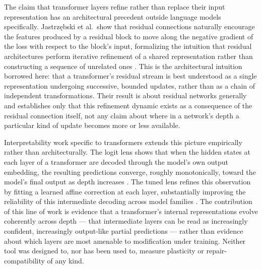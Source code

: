 \documentclass[11pt]{article}
\begin{document}
The claim that transformer layers refine rather than replace their input representation has an architectural precedent outside language models specifically. Jastrz\k{e}bski et al.\ show that residual connections naturally encourage the features produced by a residual block to move along the negative gradient of the loss with respect to the block's input, formalizing the intuition that residual architectures perform iterative refinement of a shared representation rather than constructing a sequence of unrelated ones \cite{jastrzebski2018residual}. This is the architectural intuition borrowed here: that a transformer's residual stream is best understood as a single representation undergoing successive, bounded updates, rather than as a chain of independent transformations. Their result is about residual networks generally and establishes only that this refinement dynamic exists as a consequence of the residual connection itself, not any claim about where in a network's depth a particular kind of update becomes more or less available.

Interpretability work specific to transformers extends this picture empirically rather than architecturally. The logit lens shows that when the hidden states at each layer of a transformer are decoded through the model's own output embedding, the resulting predictions converge, roughly monotonically, toward the model's final output as depth increases \cite{nostalgebraist2020}. The tuned lens refines this observation by fitting a learned affine correction at each layer, substantially improving the reliability of this intermediate decoding across model families \cite{belrose2023tuned}. The contribution of this line of work is evidence that a transformer's internal representations evolve coherently across depth --- that intermediate layers can be read as increasingly confident, increasingly output-like partial predictions --- rather than evidence about which layers are most amenable to modification under training. Neither tool was designed to, nor has been used to, measure plasticity or repair-compatibility of any kind.
\end{document}
